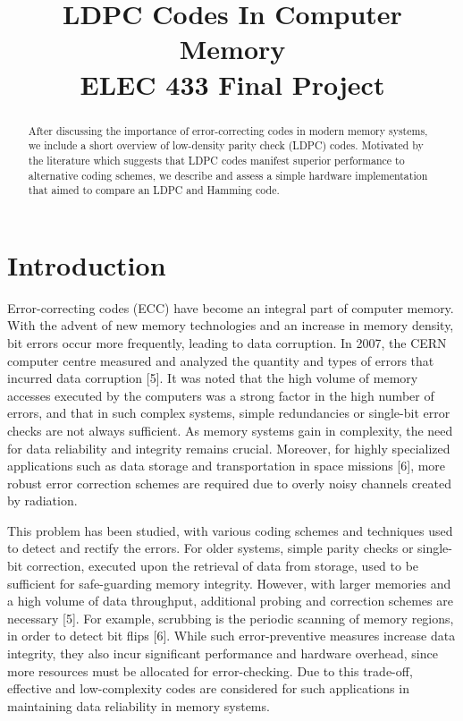 \documentclass[conference]{IEEEtran}
\begin{document}
\title{LDPC Codes In Computer Memory\\
{\large ELEC 433 Final Project}
}

\author{
  \and
}

\maketitle

\begin{abstract}
After discussing the importance of error-correcting codes in modern memory systems, we include a short overview of low-density parity check (LDPC) codes.
Motivated by the literature which suggests that LDPC codes manifest superior performance to alternative coding schemes, we describe and assess a simple hardware
implementation that aimed to compare an LDPC and Hamming code.
\end{abstract}

\section{Introduction}
Error-correcting codes (ECC) have become an integral part of computer memory.
With the advent of new memory technologies and an increase in memory density, bit errors occur more frequently, leading to data corruption.
In 2007, the CERN computer centre measured and analyzed the quantity and types of errors that incurred data corruption [5].
It was noted that the high volume of memory accesses executed by the computers was a strong factor in the high number of errors, and that in such complex systems, simple redundancies or single-bit error checks are not always sufficient.
As memory systems gain in complexity, the need for data reliability and integrity remains crucial.
Moreover, for highly specialized applications such as data storage and transportation in space missions [6], more robust error correction schemes are required due to overly noisy channels created by radiation.

This problem has been studied, with various coding schemes and techniques used to detect and rectify the errors.
For older systems, simple parity checks or single-bit correction, executed upon the retrieval of data from storage, used to be sufficient for safe-guarding memory integrity.
However, with larger memories and a high volume of data throughput, additional probing and correction schemes are necessary [5].
For example, scrubbing is the periodic scanning of memory regions, in order to detect bit flips [6].
While such error-preventive measures increase data integrity, they also incur significant performance and hardware overhead, since more resources must be allocated for error-checking.
Due to this trade-off, effective and low-complexity codes are considered for such applications in maintaining data reliability in memory systems.
\end{document}
